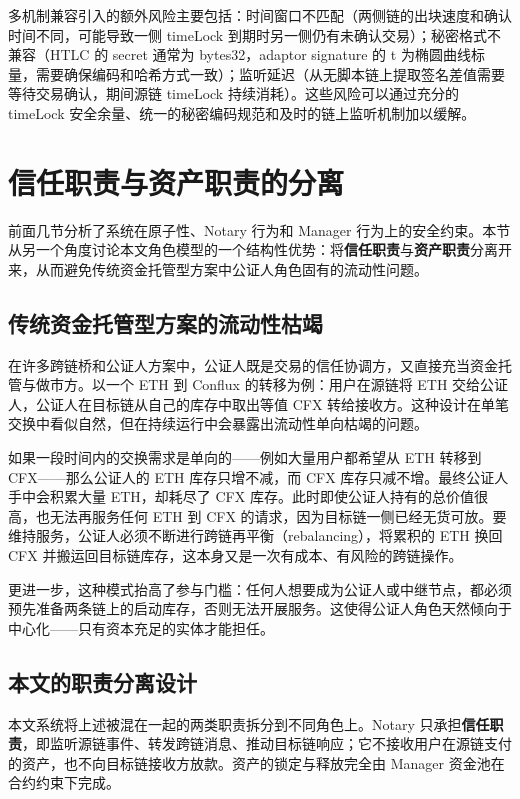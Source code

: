 多机制兼容引入的额外风险主要包括：时间窗口不匹配（两侧链的出块速度和确认时间不同，可能导致一侧 timeLock 到期时另一侧仍有未确认交易）；秘密格式不兼容（HTLC 的 secret 通常为 bytes32，adaptor signature 的 t 为椭圆曲线标量，需要确保编码和哈希方式一致）；监听延迟（从无脚本链上提取签名差值需要等待交易确认，期间源链 timeLock 持续消耗）。这些风险可以通过充分的 timeLock 安全余量、统一的秘密编码规范和及时的链上监听机制加以缓解。


\section{信任职责与资产职责的分离}


前面几节分析了系统在原子性、Notary 行为和 Manager 行为上的安全约束。本节从另一个角度讨论本文角色模型的一个结构性优势：将\textbf{信任职责}与\textbf{资产职责}分离开来，从而避免传统资金托管型方案中公证人角色固有的流动性问题。

\subsection{传统资金托管型方案的流动性枯竭}


在许多跨链桥和公证人方案中，公证人既是交易的信任协调方，又直接充当资金托管与做市方。以一个 ETH 到 Conflux 的转移为例：用户在源链将 ETH 交给公证人，公证人在目标链从自己的库存中取出等值 CFX 转给接收方。这种设计在单笔交换中看似自然，但在持续运行中会暴露出流动性单向枯竭的问题。

如果一段时间内的交换需求是单向的——例如大量用户都希望从 ETH 转移到 CFX——那么公证人的 ETH 库存只增不减，而 CFX 库存只减不增。最终公证人手中会积累大量 ETH，却耗尽了 CFX 库存。此时即使公证人持有的总价值很高，也无法再服务任何 ETH 到 CFX 的请求，因为目标链一侧已经无货可放。要维持服务，公证人必须不断进行跨链再平衡（rebalancing），将累积的 ETH 换回 CFX 并搬运回目标链库存，这本身又是一次有成本、有风险的跨链操作。

更进一步，这种模式抬高了参与门槛：任何人想要成为公证人或中继节点，都必须预先准备两条链上的启动库存，否则无法开展服务。这使得公证人角色天然倾向于中心化——只有资本充足的实体才能担任。

\subsection{本文的职责分离设计}


本文系统将上述被混在一起的两类职责拆分到不同角色上。Notary 只承担\textbf{信任职责}，即监听源链事件、转发跨链消息、推动目标链响应；它不接收用户在源链支付的资产，也不向目标链接收方放款。资产的锁定与释放完全由 Manager 资金池在合约约束下完成。


